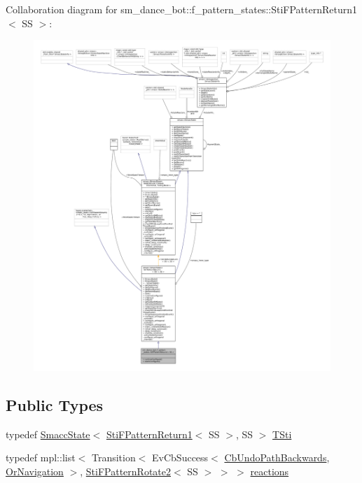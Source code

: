 Collaboration diagram for sm\+\_\+dance\+\_\+bot\+:\+:f\+\_\+pattern\+\_\+states\+:\+:Sti\+F\+Pattern\+Return1$<$ SS $>$\+:
\nopagebreak
\begin{figure}[H]
\begin{center}
\leavevmode
\includegraphics[width=350pt]{structsm__dance__bot_1_1f__pattern__states_1_1StiFPatternReturn1__coll__graph}
\end{center}
\end{figure}
\subsection*{Public Types}
\begin{DoxyCompactItemize}
\item 
typedef \hyperlink{classSmaccState}{Smacc\+State}$<$ \hyperlink{structsm__dance__bot_1_1f__pattern__states_1_1StiFPatternReturn1}{Sti\+F\+Pattern\+Return1}$<$ SS $>$, SS $>$ \hyperlink{structsm__dance__bot_1_1f__pattern__states_1_1StiFPatternReturn1_afd0d5d7e8dc6ad87f7314176d86d919e}{T\+Sti}
\item 
typedef mpl\+::list$<$ Transition$<$ Ev\+Cb\+Success$<$ \hyperlink{classcl__move__base__z_1_1CbUndoPathBackwards}{Cb\+Undo\+Path\+Backwards}, \hyperlink{classsm__dance__bot_1_1OrNavigation}{Or\+Navigation} $>$, \hyperlink{structsm__dance__bot_1_1f__pattern__states_1_1StiFPatternRotate2}{Sti\+F\+Pattern\+Rotate2}$<$ SS $>$ $>$ $>$ \hyperlink{structsm__dance__bot_1_1f__pattern__states_1_1StiFPatternReturn1_a747aac2531a2b77a918254033102a118}{reactions}
\end{DoxyCompactItemize}
